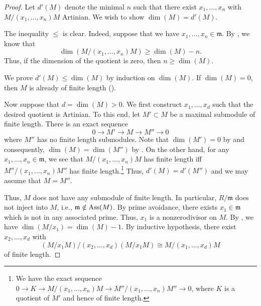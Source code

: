 \documentclass[12pt]{article}
\begin{document}
\begin{proof} 
	Let $d'(M)$ denote the minimal $n$ such that there exist $x_{1}, \ldots, x_{n}$ with $M/(x_{1}, \ldots, x_{n})M$ Artinian. We wish to show $\dim(M) = d'(M)$.

	The inequality $\le$ is clear. Indeed, suppose that we have $x_{1}, \ldots, x_{n} \in \mathfrak{m}$. By , we know that
	\begin{equation*} 
		\dim(M/(x_{1}, \ldots, x_{n}) M) \ge \dim(M) - n.
	\end{equation*}
	Thus, if the dimension of the quotient is zero, then $n \ge \dim(M)$.

	We prove $d'(M) \le \dim(M)$ by induction on $\dim(M)$. If $\dim(M) = 0$, then $M$ is already of finite length ().

	Now suppose that $d = \dim(M) > 0$. We first construct $x_{1}, \ldots, x_{d}$ such that the desired quotient is Artinian. \newline
	To this end, let $M' \subset M$ be a maximal submodule of finite length. There is an exact sequence
	\begin{equation*} 
		0 \to M' \to M \to M'' \to 0
	\end{equation*}
	where $M''$ has no finite length submodules. Note that $\dim(M') = 0$ by  and consequently, $\dim(M) = \dim(M'')$ by . \newline
	On the other hand, for any $x_{1}, \ldots, x_{n} \in \mathfrak{m}$, we see that $M/(x_{1}, \ldots, x_{n})M$ has finite length iff $M''/(x_{1}, \ldots, x_{n})M''$ has finite length.\footnote{We have the exact sequence $0 \to K \to M/(x_{1}, \ldots, x_{n})M \to M''/(x_{1}, \ldots, x_{n})M'' \to 0$, where $K$ is a quotient of $M'$ and hence of finite length.} Thus, $d'(M) = d'(M'')$ and we may assume that $M = M''$.

	Thus, $M$ does not have any submodule of finite length. In particular, $R/\mathfrak{m}$ does not inject into $M$, i.e., $\mathfrak{m} \notin \operatorname{Ass}(M)$. By prime avoidance, there exists $x_{1} \in \mathfrak{m}$ which is not in any associated prime. Thus, $x_{1}$ is a nonzerodivisor on $M$. By , we have $\dim(M/x_{1}) = \dim(M) - 1$. \newline
	By inductive hypothesis, there exist $x_{2}, \ldots, x_{d}$ with
	\begin{equation*} 
		(M/x_{1} M)/(x_{2}, \ldots, x_{d})(M/x_{1} M) \cong M/(x_{1}, \ldots, x_{d})M
	\end{equation*}
	of finite length. 
\end{proof}
\end{document}
